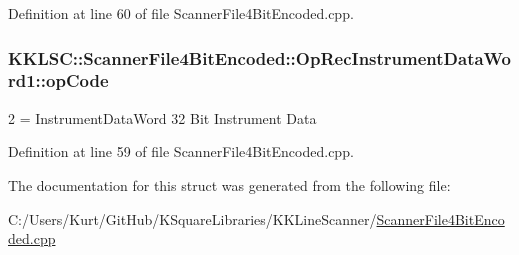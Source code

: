 Definition at line 60 of file Scanner\+File4\+Bit\+Encoded.\+cpp.

\subsubsection[{\texorpdfstring{op\+Code}{opCode}}]{ K\+K\+L\+S\+C\+::\+Scanner\+File4\+Bit\+Encoded\+::\+Op\+Rec\+Instrument\+Data\+Word1\+::op\+Code}\hypertarget{struct_scanner_file4_bit_encoded_1_1_op_rec_instrument_data_word1_ab40058bc2a010ec87640c2d56f698e4f}{}\label{struct_scanner_file4_bit_encoded_1_1_op_rec_instrument_data_word1_ab40058bc2a010ec87640c2d56f698e4f}
2 = Instrument\+Data\+Word 32 Bit Instrument Data 

Definition at line 59 of file Scanner\+File4\+Bit\+Encoded.\+cpp.



The documentation for this struct was generated from the following file\+:\begin{DoxyCompactItemize}
\item 
C\+:/\+Users/\+Kurt/\+Git\+Hub/\+K\+Square\+Libraries/\+K\+K\+Line\+Scanner/\hyperlink{_scanner_file4_bit_encoded_8cpp}{Scanner\+File4\+Bit\+Encoded.\+cpp}\end{DoxyCompactItemize}
